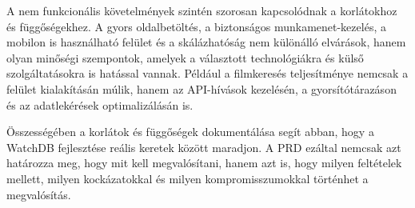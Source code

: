 A nem funkcionális követelmények szintén szorosan kapcsolódnak a korlátokhoz és függőségekhez. A gyors oldalbetöltés, a biztonságos munkamenet-kezelés, a mobilon is használható felület és a skálázhatóság nem különálló elvárások, hanem olyan minőségi szempontok, amelyek a választott technológiákra és külső szolgáltatásokra is hatással vannak. Például a filmkeresés teljesítménye nemcsak a felület kialakításán múlik, hanem az API-hívások kezelésén, a gyorsítótárazáson és az adatlekérések optimalizálásán is.

Összességében a korlátok és függőségek dokumentálása segít abban, hogy a WatchDB fejlesztése reális keretek között maradjon. A PRD ezáltal nemcsak azt határozza meg, hogy mit kell megvalósítani, hanem azt is, hogy milyen feltételek mellett, milyen kockázatokkal és milyen kompromisszumokkal történhet a megvalósítás.
